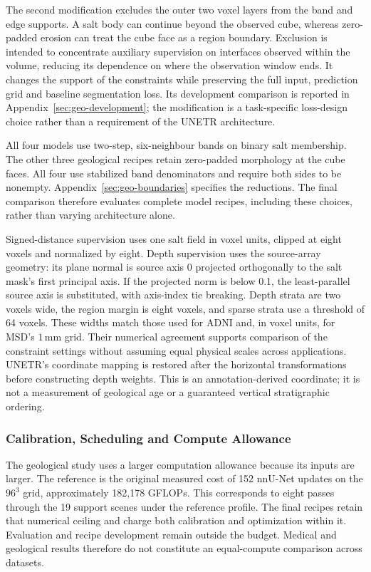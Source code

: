 The second modification excludes the outer two voxel layers from the
band and edge supports. A salt body can continue beyond the observed
cube, whereas zero-padded erosion can treat the cube face as a region
boundary. Exclusion is intended to concentrate auxiliary supervision
on interfaces observed within the volume, reducing its dependence on
where the observation window ends. It changes the support of the
constraints while preserving the full input, prediction grid and
baseline segmentation loss. Its development comparison is reported in
Appendix~\ref{sec:geo-development}; the modification is a task-specific
loss-design choice rather than a requirement of the UNETR architecture.

All four models use two-step, six-neighbour bands on binary salt
membership. The other three geological recipes retain zero-padded
morphology at the cube faces. All four use stabilized band denominators
and require both sides to be nonempty.
Appendix~\ref{sec:geo-boundaries} specifies the reductions. The final
comparison therefore evaluates complete model recipes, including these
choices, rather than varying architecture alone.

Signed-distance supervision uses one salt field in voxel units, clipped
at eight voxels and normalized by eight. Depth supervision uses the
source-array geometry: its plane normal is source axis 0 projected
orthogonally to the salt mask's first principal axis. If the projected
norm is below 0.1, the least-parallel source axis is substituted, with
axis-index tie breaking. Depth strata are two voxels wide, the region
margin is eight voxels, and sparse strata use a threshold of 64 voxels.
These widths match those used for ADNI and, in voxel units, for MSD's
$1\,\mathrm{mm}$ grid. Their numerical agreement supports comparison of
the constraint settings without assuming equal physical scales across
applications.
UNETR's coordinate mapping is restored after the horizontal transformations before
constructing depth weights. This is an annotation-derived coordinate;
it is not a measurement of geological age or a guaranteed vertical
stratigraphic ordering.

\subsubsection{Calibration, Scheduling and Compute Allowance}

The geological study uses a larger computation allowance because its
inputs are larger. The reference is the original measured cost of 152
nnU-Net updates on the $96^3$ grid, approximately 182,178 GFLOPs. This
corresponds to eight passes through the 19 support scenes under the
reference profile. The final recipes retain that numerical ceiling and
charge both calibration and optimization within it. Evaluation and recipe
development remain outside the budget. Medical and geological results
therefore do not constitute an equal-compute comparison across datasets.

